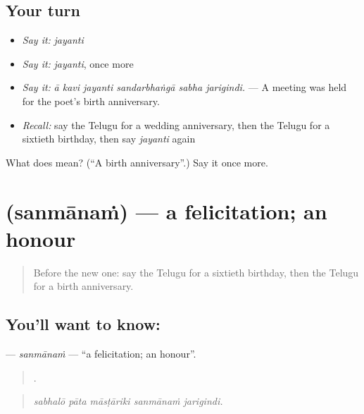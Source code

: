 \subsection*{Your turn}
\begin{itemize}
\raggedright
  \item \emph{Say it:} \emph{jayanti}
  \item \emph{Say it:} \emph{jayanti}, once more
  \item \emph{Say it:} \emph{ā kavi jayanti sandarbhaṅgā sabha jarigindi.} — A meeting was held for the poet's birth anniversary.
  \item \emph{Recall:} say the Telugu for a wedding anniversary, then the Telugu for a sixtieth birthday, then say \emph{jayanti} again
\end{itemize}

\begin{tcolorbox}[breakable,colback=teal!4,colframe=teal!35!black,title={Before you move on}]
What does  mean? (\textquotedblleft{}A birth anniversary\textquotedblright{}.) Say it once more.
\end{tcolorbox}
\section[\texorpdfstring{\te{సన్మానం} (sanmānaṁ)}{సన్మానం (sanmānaṁ)}]{ (sanmānaṁ) — a felicitation; an honour}

\label{lesson:TE-C355-sanmanam}



\begin{quote}
Before the new one: say the Telugu for a sixtieth birthday, then the Telugu for a birth anniversary.
\end{quote}

\subsection*{You'll want to know: }
\textbf{} — \emph{sanmānaṁ} — \textquotedblleft{}a felicitation; an honour\textquotedblright{}.

\begin{quote}
    .
\end{quote}

\begin{quote}
\emph{sabhalō pāta māsṭāriki sanmānaṁ jarigindi.}
\end{quote}

